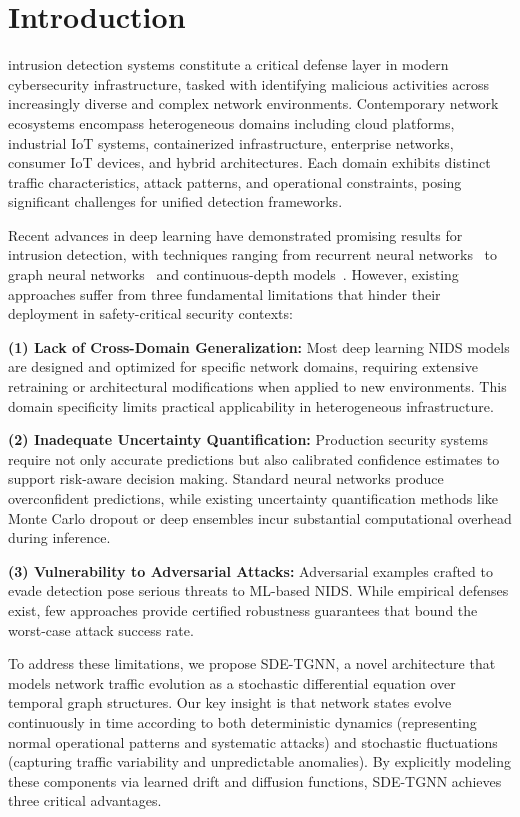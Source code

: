 \documentclass[10pt,journal,compsoc]{IEEEtran}
\begin{document}
\section{Introduction}
\label{sec:introduction}
 intrusion detection systems constitute a critical defense layer in modern cybersecurity infrastructure, tasked with identifying malicious activities across increasingly diverse and complex network environments. Contemporary network ecosystems encompass heterogeneous domains including cloud platforms, industrial IoT systems, containerized infrastructure, enterprise networks, consumer IoT devices, and hybrid architectures. Each domain exhibits distinct traffic characteristics, attack patterns, and operational constraints, posing significant challenges for unified detection frameworks.

Recent advances in deep learning have demonstrated promising results for intrusion detection, with techniques ranging from recurrent neural networks~\cite{kim2016lstm} to graph neural networks~\cite{kipf2017semi} and continuous-depth models~\cite{chen2018neural}. However, existing approaches suffer from three fundamental limitations that hinder their deployment in safety-critical security contexts:

\textbf{(1) Lack of Cross-Domain Generalization:} Most deep learning NIDS models are designed and optimized for specific network domains, requiring extensive retraining or architectural modifications when applied to new environments. This domain specificity limits practical applicability in heterogeneous infrastructure.

\textbf{(2) Inadequate Uncertainty Quantification:} Production security systems require not only accurate predictions but also calibrated confidence estimates to support risk-aware decision making. Standard neural networks produce overconfident predictions, while existing uncertainty quantification methods like Monte Carlo dropout or deep ensembles incur substantial computational overhead during inference.

\textbf{(3) Vulnerability to Adversarial Attacks:} Adversarial examples crafted to evade detection pose serious threats to ML-based NIDS. While empirical defenses exist, few approaches provide certified robustness guarantees that bound the worst-case attack success rate.

To address these limitations, we propose SDE-TGNN, a novel architecture that models network traffic evolution as a stochastic differential equation over temporal graph structures. Our key insight is that network states evolve continuously in time according to both deterministic dynamics (representing normal operational patterns and systematic attacks) and stochastic fluctuations (capturing traffic variability and unpredictable anomalies). By explicitly modeling these components via learned drift and diffusion functions, SDE-TGNN achieves three critical advantages.
\end{document}
